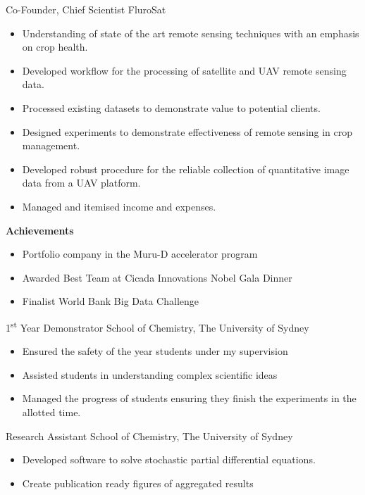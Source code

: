 {Co-Founder, Chief Scientist}
{FluroSat}{}{}
{%
  \begin{itemize}
    \item Understanding of state of the art remote sensing techniques with an emphasis on crop health.
    \item Developed workflow for the processing of satellite and UAV remote sensing data.
    \item Processed existing datasets to demonstrate value to potential clients.
    \item Designed experiments to demonstrate effectiveness of remote sensing in crop management.
    \item Developed robust procedure for the reliable collection of quantitative image data from a UAV platform.
    \item Managed and itemised income and expenses.
  \end{itemize}
  \textbf{Achievements}
  \begin{itemize}
    \item Portfolio company in the Muru-D accelerator program
    \item Awarded Best Team at Cicada Innovations Nobel Gala Dinner
    \item Finalist World Bank Big Data Challenge
  \end{itemize}
}
\vspace{1em}

{1\textsuperscript{st} Year Demonstrator}
{School of Chemistry, The University of Sydney}
{}{}
{%
  \begin{itemize}
    \item Ensured the safety of the  year students under my supervision
    \item Assisted students in understanding complex scientific ideas
    \item Managed the progress of students ensuring they finish the experiments in the allotted time.
  \end{itemize}
}
\vspace{1em}

{Research Assistant}
{School of Chemistry, The University of Sydney}
{}{}{%
  \begin{itemize}
    \item Developed software to solve stochastic partial differential equations.
    \item Create publication ready figures of aggregated results
  \end{itemize}
}
\vspace{1em}

